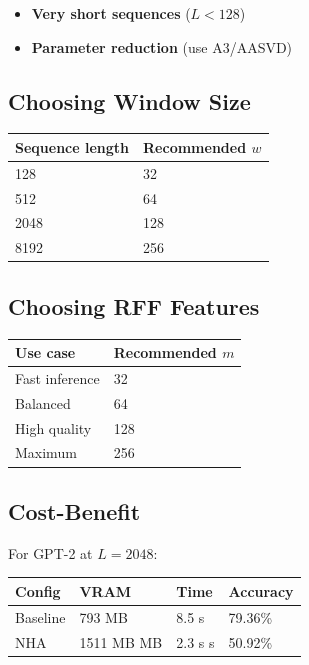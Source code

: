 \begin{itemize}
\item \textbf{Very short sequences} ($L < 128$)
\item \textbf{Parameter reduction} (use A3/AASVD)

\end{itemize}
\subsection{Choosing Window Size}

\begin{table}[H]
\centering
\small
\begin{tabular}{ll}
\toprule
\textbf{Sequence length} & \textbf{Recommended $w$} \\
\midrule
128 & 32 \\
512 & 64 \\
2048 & 128 \\
8192 & 256 \\
\bottomrule
\end{tabular}
\end{table}

\subsection{Choosing RFF Features}

\begin{table}[H]
\centering
\small
\begin{tabular}{ll}
\toprule
\textbf{Use case} & \textbf{Recommended $m$} \\
\midrule
Fast inference & 32 \\
Balanced & 64 \\
High quality & 128 \\
Maximum & 256 \\
\bottomrule
\end{tabular}
\end{table}

\subsection{Cost-Benefit}

For GPT-2 at $L = 2048$:

\begin{table}[H]
\centering
\small
\begin{tabular}{llll}
\toprule
\textbf{Config} & \textbf{VRAM} & \textbf{Time} & \textbf{Accuracy} \\
\midrule
Baseline & 793 MB & 8.5 s & 79.36\% \\
NHA & 1511 MB MB & 2.3 s s & 50.92\% \\
\bottomrule
\end{tabular}
\end{table}

